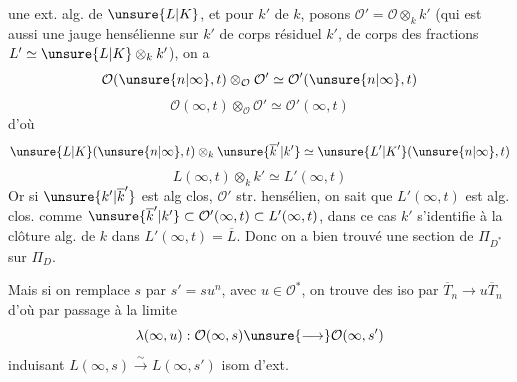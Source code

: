 
une ext. alg. de $\unsure{L|K}$, et pour    $k'$ de $k$, posons $\mathcal{O}'=\mathcal{O}\otimes_k k'$ (qui est aussi une jauge hensélienne sur $k'$ de corps résiduel $k'$, de corps des fractions $L'\simeq\unsure{L|K}\otimes_k k'$), on a  
\[
\mathcal{O}(\unsure{n|\infty},t)\otimes_{\mathcal{O}}\mathcal{O}'\simeq\mathcal{O}'(\unsure{n|\infty},t)
\]
\[
\mathcal{O}(\infty,t)\otimes_{\mathcal{O}}\mathcal{O}'\simeq\mathcal{O}'(\infty,t)
\]
d'où
\[
\unsure{L|K}(\unsure{n|\infty},t)\otimes_k\unsure{\overline{k}'|k'}\simeq\unsure{L'|K'}(\unsure{n|\infty},t)
\]
\[
L(\infty,t)\otimes_k k'\simeq L'(\infty,t)
\]
Or si $\unsure{k'|\overline{k}'}$ est alg clos,  $\mathcal{O}'$ str. hensélien, on sait que $L'(\infty,t)$ est  alg. clos.
 comme $\unsure{\overline{k}'|k'}\subset\mathcal{O}'(\infty,t)\subset L'(\infty,t)$, dans ce cas $k'$  s'identifie à la clôture alg.  de $k$ dans $L'(\infty,t)=\overline{L}$.
Donc on a bien trouvé une section de $\Pi_{D^*}$ sur $\Pi_D$.

Mais si on remplace $s$ par $s'=su^n$, avec $u\in\mathcal{O}^*$, on trouve des iso
par $\overline{T}_n\to u\overline{T}_n$
d'où par passage à la limite
\[
\lambda(\infty,u):\mathcal{O}(\infty,s)\unsure{\longrightarrow}\mathcal{O}(\infty,s')
\]
induisant $L(\infty,s)\xrightarrow{\sim}L(\infty,s')$ isom d'ext.


